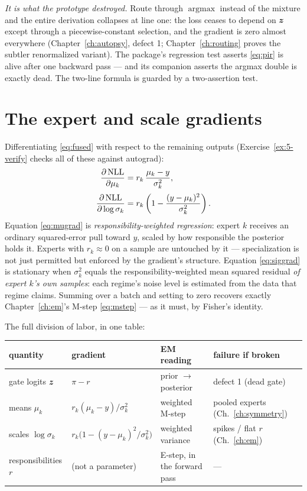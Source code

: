 \emph{It is what the prototype destroyed.} Route through
$\operatorname{argmax}$ instead of the mixture and the entire derivation
collapses at line one: the loss ceases to depend on $\bm{z}$ except through
a piecewise-constant selection, and the gradient is zero almost
everywhere (Chapter~\ref{ch:autopsy}, defect 1;
Chapter~\ref{ch:routing} proves the subtler renormalized variant). The
package's regression test  asserts
\eqref{eq:pir} is alive after one backward pass --- and its companion
asserts the argmax double is exactly dead. The two-line formula is
guarded by a two-assertion test.

\section{The expert and scale gradients}\label{sec:expertgradients}

Differentiating \eqref{eq:fused} with respect to the remaining outputs
(Exercise~\ref{ex:5-verify} checks all of these against autograd):
\begin{align}
  \frac{\partial\, \mathrm{NLL}}{\partial \mu_k}
  &= r_k\, \frac{\mu_k - y}{\sigma_k^2},
  \label{eq:mugrad}\\[2pt]
  \frac{\partial\, \mathrm{NLL}}{\partial \log \sigma_k}
  &= r_k \left(1 - \frac{(y - \mu_k)^2}{\sigma_k^2}\right).
  \label{eq:siggrad}
\end{align}
Equation \eqref{eq:mugrad} is \emph{responsibility-weighted regression}:
expert $k$ receives an ordinary squared-error pull toward $y$, scaled by
how responsible the posterior holds it. Experts with $r_k \approx 0$ on a
sample are untouched by it --- specialization is not just permitted but
enforced by the gradient's structure. Equation \eqref{eq:siggrad} is
stationary when $\sigma_k^2$ equals the responsibility-weighted mean
squared residual \emph{of expert $k$'s own samples}: each regime's noise
level is estimated from the data that regime claims. Summing over a batch
and setting to zero recovers exactly Chapter~\ref{ch:em}'s M-step
\eqref{eq:mstep} --- as it must, by Fisher's identity.

The full division of labor, in one table:

\begin{center}
\small
\begin{tabular}{@{}llll@{}}
\toprule
quantity & gradient & EM reading & failure if broken \\
\midrule
gate logits $\bm{z}$ & $\pi - r$ & prior $\to$ posterior
  & defect 1 (dead gate) \\
means $\mu_k$ & $r_k(\mu_k - y)/\sigma_k^2$ & weighted M-step
  & pooled experts (Ch.~\ref{ch:symmetry}) \\
scales $\log\sigma_k$ & $r_k\bigl(1 - (y-\mu_k)^2/\sigma_k^2\bigr)$
  & weighted variance & spikes / flat $r$ (Ch.~\ref{ch:em}) \\
responsibilities $r$ & (not a parameter) & E-step, in the forward pass
  & --- \\
\bottomrule
\end{tabular}
\end{center}

